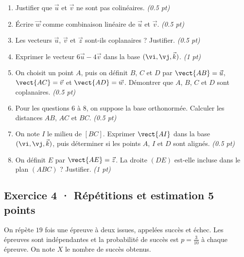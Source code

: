 \begin{enumerate}

\item Justifier que $\vec u$ et $\vec v$ ne sont pas colinéaires. \hfill\textit{(\num{0,5} pt)}

\item Écrire $\vec w$ comme combinaison linéaire de $\vec u$ et $\vec v$. \hfill\textit{(\num{0,5} pt)}

\item Les vecteurs $\vec u$, $\vec v$ et $\vec z$ sont-ils coplanaires ? Justifier. \hfill\textit{(\num{0,5} pt)}

\item Exprimer le vecteur $6\vec u-4\vec v$ dans la base $(\vi,\vj,\vec k)$. \hfill\textit{(1 pt)}

\item On choisit un point $A$, puis on définit $B$, $C$ et $D$ par $\vect{AB}=\vec u$, $\vect{AC}=\vec v$ et $\vect{AD}=\vec w$. Démontrer que $A$, $B$, $C$ et $D$ sont coplanaires. \hfill\textit{(\num{0,5} pt)}

\item Pour les questions 6 à 8, on suppose la base orthonormée. Calculer les distances $AB$, $AC$ et $BC$. \hfill\textit{(\num{0,5} pt)}

\item On note $I$ le milieu de $[BC]$. Exprimer $\vect{AI}$ dans la base $(\vi,\vj,\vec k)$, puis déterminer si les points $A$, $I$ et $D$ sont alignés. \hfill\textit{(\num{0,5} pt)}

\item On définit $E$ par $\vect{AE}=\vec z$. La droite $(DE)$ est-elle incluse dans le plan $(ABC)$ ? Justifier. \hfill\textit{(1 pt)}

\end{enumerate}

\subsection*{Exercice 4 · Répétitions et estimation \hfill 5 points}On répète $19$ fois une épreuve à deux issues, appelées succès et échec. Les épreuves sont indépendantes et la probabilité de succès est $p=\frac{3}{10}$ à chaque épreuve. On note $X$ le nombre de succès obtenus.

